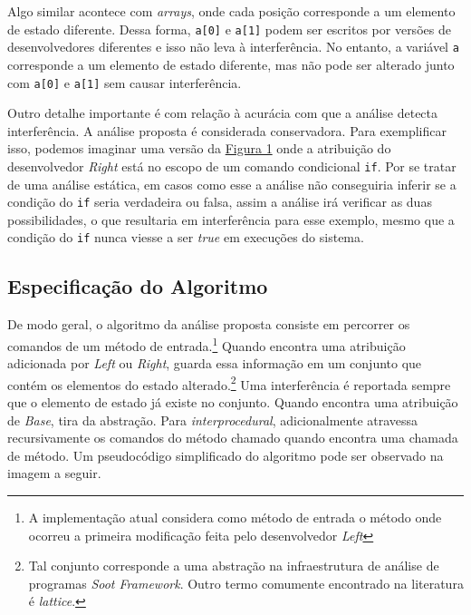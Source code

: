 Algo similar acontece com \emph{arrays}, onde cada posição corresponde a um elemento de estado diferente. Dessa forma, \texttt{a[0]} e \texttt{a[1]} podem ser escritos por versões de desenvolvedores diferentes e isso não leva à interferência. No entanto, a variável \texttt{a} corresponde a um elemento de estado diferente, mas não pode ser alterado junto com \texttt{a[0]} e \texttt{a[1]} sem causar interferência.

Outro detalhe importante é com relação à acurácia com que a análise detecta interferência. A análise proposta é considerada conservadora. Para exemplificar isso, podemos imaginar uma versão da \hyperref[fig:codigo-motivador]{Figura 1} onde a atribuição do desenvolvedor \emph{Right} está no escopo de um comando condicional \texttt{if}. Por se tratar de uma análise estática, em casos como esse a análise não conseguiria inferir se a condição do \texttt{if} seria verdadeira ou falsa, assim a análise irá verificar as duas possibilidades, o que resultaria em interferência para esse exemplo, mesmo que a condição do \texttt{if} nunca viesse a ser \emph{true} em execuções do sistema.

\subsection{Especificação do Algoritmo}

De modo geral, o algoritmo da análise proposta consiste em percorrer os comandos de um método de entrada.\footnote{A implementação atual considera como método de entrada o método onde ocorreu a primeira modificação feita pelo desenvolvedor \emph{Left}} Quando encontra uma atribuição adicionada por \emph{Left} ou \emph{Right}, guarda essa informação em um conjunto que contém os elementos do estado alterado.\footnote{Tal conjunto corresponde a uma abstração na infraestrutura de análise de programas \emph{Soot Framework}. Outro termo comumente encontrado na literatura é \emph{lattice}.} Uma interferência é reportada sempre que o elemento de estado já existe no conjunto. Quando encontra uma atribuição de \emph{Base}, tira da abstração. Para \emph{interprocedural}, adicionalmente atravessa recursivamente os comandos do método chamado quando encontra uma chamada de método. Um pseudocódigo simplificado do algoritmo pode ser observado na imagem a seguir.

